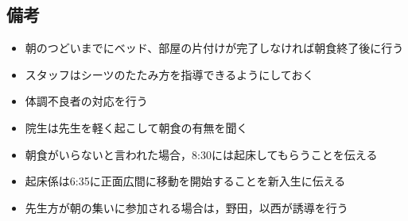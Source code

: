 \subsection{備考}
\begin{itemize}
\item 朝のつどいまでにベッド、部屋の片付けが完了しなければ朝食終了後に行う
\item スタッフはシーツのたたみ方を指導できるようにしておく
\item 体調不良者の対応を行う
\item 院生は先生を軽く起こして朝食の有無を聞く
\item 朝食がいらないと言われた場合，8:30には起床してもらうことを伝える
\item 起床係は6:35に正面広間に移動を開始することを新入生に伝える
\item 先生方が朝の集いに参加される場合は，野田，以西が誘導を行う
\end{itemize}

%
